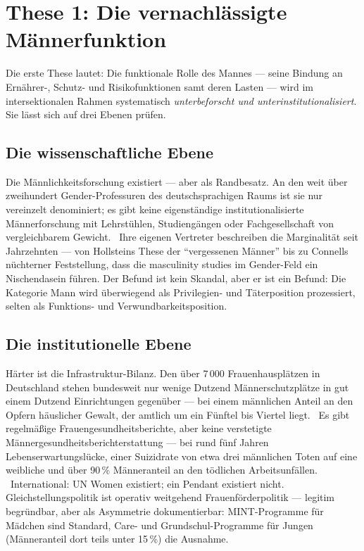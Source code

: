 \section{These 1: Die vernachlässigte Männerfunktion}

Die erste These lautet: Die funktionale Rolle des Mannes --- seine Bindung an
Ernährer-, Schutz- und Risikofunktionen samt deren Lasten --- wird im
intersektionalen Rahmen systematisch \emph{unterbeforscht und
unterinstitutionalisiert}. Sie lässt sich auf drei Ebenen prüfen.

\subsection{Die wissenschaftliche Ebene}

Die Männlichkeitsforschung existiert --- aber als Randbesatz. An den weit über
zweihundert Gender-Professuren des deutschsprachigen Raums ist sie nur
vereinzelt denominiert; es gibt keine eigenständige institutionalisierte
Männerforschung mit Lehrstühlen, Studiengängen oder Fachgesellschaft von
vergleichbarem Gewicht. \plausibel\ Ihre eigenen Vertreter beschreiben die
Marginalität seit Jahrzehnten --- von Hollsteins These der \enquote{vergessenen
Männer} bis zu Connells nüchterner Feststellung, dass die masculinity studies
im Gender-Feld ein Nischendasein führen. Der Befund ist kein Skandal, aber er
ist ein Befund: Die Kategorie Mann wird überwiegend als Privilegien- und
Täterposition prozessiert, selten als Funktions- und Verwundbarkeitsposition.

\subsection{Die institutionelle Ebene}

Härter ist die Infrastruktur-Bilanz. Den über 7\,000 Frauenhausplätzen in
Deutschland stehen bundesweit nur wenige Dutzend Männerschutzplätze in gut
einem Dutzend Einrichtungen gegenüber --- bei einem männlichen Anteil an den
Opfern häuslicher Gewalt, der amtlich um ein Fünftel bis Viertel liegt.
\plausibel\ Es gibt regelmäßige Frauengesundheitsberichte, aber keine
verstetigte Männergesundheitsberichterstattung --- bei rund fünf Jahren
Lebenserwartungslücke, einer Suizidrate von etwa drei männlichen Toten auf
eine weibliche und über 90\,\% Männeranteil an den tödlichen Arbeitsunfällen.
\belegt\ International: UN Women existiert; ein Pendant existiert nicht.
Gleichstellungspolitik ist operativ weitgehend Frauenförderpolitik ---
legitim begründbar, aber als Asymmetrie dokumentierbar: MINT-Programme für
Mädchen sind Standard, Care- und Grundschul-Programme für Jungen (Männeranteil
dort teils unter 15\,\%) die Ausnahme.

